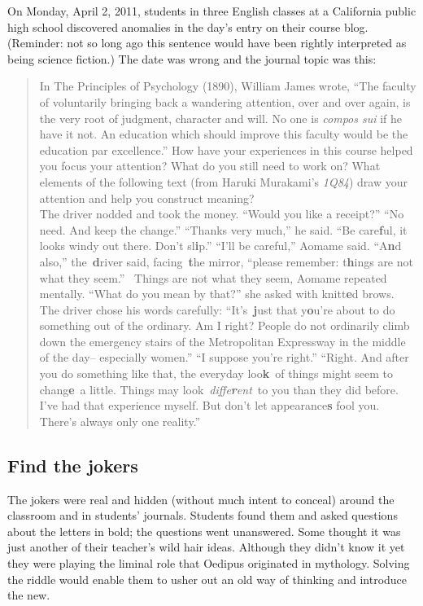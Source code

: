 On Monday, April 2, 2011, students in three English classes at a
California public high school discovered anomalies in the day's entry on
their course blog. (Reminder: not so long ago this sentence would have
been rightly interpreted as being science fiction.) The date was wrong
and the journal topic was this:

\begin{quote}
In The Principles of Psychology (1890), William James wrote, ``The
faculty of voluntarily bringing back a wandering attention, over and
over again, is the very root of judgment, character and will. No one is
\emph{compos sui} if he have it not. An education which should improve
this faculty would be the education par excellence.'' How have your
experiences in this course helped you focus your attention? What do you
still need to work on? What elements of the following text (from Haruki
Murakami's \emph{1Q84}) draw your attention and help you construct
meaning?\\
The driver nodded and took the money. ``Would you like a receipt?'' ``No
need. And keep the change.'' ``Thanks very much,'' he said. ``Be
care\textbf{f}ul, it looks windy out there. Don't sl\textbf{i}p.''
``I'll be careful,'' Aomame said. ``A\textbf{n}d also,''
the~\textbf{d}river said, facing~\textbf{t}he mirror, ``please remember:
t\textbf{h}ings are not what they seem.''~ Things are not what they
seem, Aomame repeated mentally. ``What do you mean by that?'' she asked
with knitt\textbf{e}d brows. The driver chose his words carefully:
``It's~\textbf{j}ust that y\textbf{o}u're about to do something out of
the ordinary. Am I right? People do not ordinarily climb down the
emergency stairs of the Metropolitan Expressway in the middle of the
day-- especially women.'' ``I suppose you're right.'' ``Right. And after
you do something like that, the everyday loo\textbf{k}~of things might
seem to chang\textbf{e}~a little. Things may
look~\emph{diffe\textbf{r}ent}~to you than they did before. I've had
that experience myself. But don't let appearance\textbf{s} fool you.
There's always only one reality.''
\end{quote}

\hypertarget{find-the-jokers}{%
\subsection{Find the jokers}\label{find-the-jokers}}

The jokers were real and hidden (without much intent to conceal) around
the classroom and in students' journals. Students found them and asked
questions about the letters in bold; the questions went unanswered. Some
thought it was just another of their teacher's wild hair ideas. Although
they didn't know it yet they were playing the liminal role that Oedipus
originated in mythology. Solving the riddle would enable them to usher
out an old way of thinking and introduce the new.

